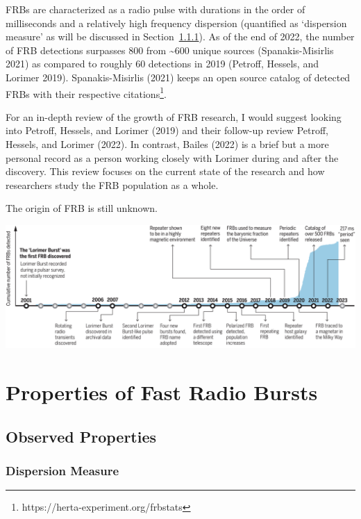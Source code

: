 \documentclass[english,singlespacedlisttitles]{umalayathesis}
\begin{document}
FRBs are characterized as a radio pulse with durations in the order of
milliseconds and a relatively high frequency dispersion (quantified as
`dispersion measure' as will be discussed in Section~\ref{sec-prop-dm}).
As of the end of 2022, the number of FRB detections surpasses 800 from
\textasciitilde600 unique sources (Spanakis-Misirlis 2021) as compared
to roughly 60 detections in 2019 (Petroff, Hessels, and Lorimer 2019).
Spanakis-Misirlis (2021) keeps an open source catalog of detected FRBs
with their respective citations\footnote{https://herta-experiment.org/frbstats}.

For an in-depth review of the growth of FRB research, I would suggest
looking into Petroff, Hessels, and Lorimer (2019) and their follow-up
review Petroff, Hessels, and Lorimer (2022). In contrast, Bailes (2022)
is a brief but a more personal record as a person working closely with
Lorimer during and after the discovery. This review focuses on the
current state of the research and how researchers study the FRB
population as a whole.

The origin of FRB is still unknown.

\includegraphics{././_assets/frb-research-review_C_Bailes2022.jpg}


\hypertarget{properties-of-fast-radio-bursts}{%
\chapter{Properties of Fast Radio
Bursts}\label{properties-of-fast-radio-bursts}}

\hypertarget{observed-properties}{%
\section{Observed Properties}\label{observed-properties}}

\hypertarget{sec-prop-dm}{%
\subsection{Dispersion Measure}\label{sec-prop-dm}}
\end{document}
